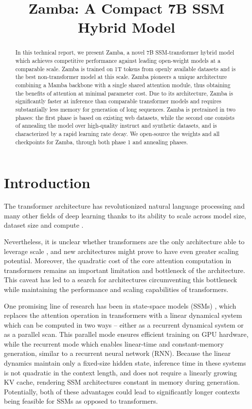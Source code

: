 \title{Zamba: A Compact 7B SSM Hybrid Model}

\begin{abstract}
In this technical report, we present Zamba, a novel 7B SSM-transformer hybrid model which achieves competitive performance against leading open-weight models at a comparable scale. Zamba is trained on 1T tokens from openly available datasets and is the best non-transformer model at this scale. Zamba pioneers a unique architecture combining a Mamba backbone with a single shared attention module, thus obtaining the benefits of attention at minimal parameter cost. Due to its architecture, Zamba is significantly faster at inference than comparable transformer models and requires substantially less memory for generation of long sequences. Zamba is pretrained in two phases: the first phase is based on existing web datasets, while the second one consists of annealing the model over high-quality instruct and synthetic datasets, and is characterized by a rapid learning rate decay. We open-source the weights and all checkpoints for Zamba, through both phase 1 and annealing phases.
\end{abstract}

\section{Introduction}

The transformer architecture \citep{vaswani2017attention} has revolutionized natural language processing and many other fields of deep learning \citep{vit,alphafold2,touvron2023llama} thanks to its ability to scale across model size, dataset size and compute \citep{kaplan2020scaling,gpt3,chinchilla,gopher}.

Nevertheless, it is unclear whether transformers are the only architecture able to leverage scale \citep{bachmann2023scaling}, and new architectures might prove to have even greater scaling potential. Moreover, the quadratic cost of the core attention computation in transformers remains an important limitation and bottleneck of the architecture. This caveat has led to a search for architectures circumventing this bottleneck while maintaining the performance and scaling capabilities of transformers.

One promising line of research has been in state-space models (SSMs) \citep{gu2021efficiently}, which replaces the attention operation in transformers with a linear dynamical system which can be computed in two ways -- either as a recurrent dynamical system or as a parallel scan. This parallel mode ensures efficient training on GPU hardware, while the recurrent mode which enables linear-time and constant-memory generation, similar to a recurrent neural network (RNN). Because the linear dynamics maintain only a fixed-size hidden state, inference time in these systems is not quadratic in the context length, and does not require a linearly growing KV cache, rendering SSM architectures constant in memory during generation. Potentially, both of these advantages could lead to significantly longer contexts being feasible for SSMs as opposed to transformers.

